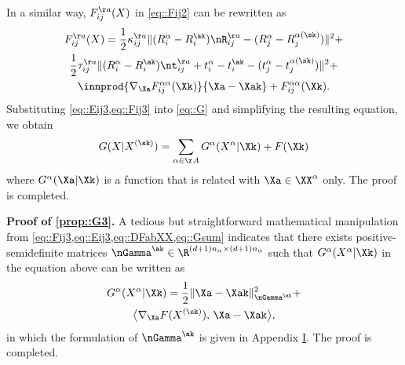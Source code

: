In a similar way, $F_{ij}^{\aa}(X)$ in \cref{eq::Fij2} can be rewritten as
\vspace{-0.3em}
\begin{multline}\label{eq::Fij3}
F_{ij}^{\aa}(X)=\frac{1}{2}\kappa_{ij}^{\aa}\|(R_i^\alpha-R_i^{\ak})\nR_{ij}^{\aa} -(R_j^\alpha-R_j^{\alpha(\sk)})\|^2 +\\ 
\frac{1}{2}\tau_{ij}^{\aa}\|(R_i^\alpha-R_i^{\ak}) \nt_{ij}^{\aa}+t_i^\alpha - t_i^{\ak} - (t_j^\alpha-t_j^{\alpha(\sk)})\|^2+\\
\innprod{\nabla_{\Xa} F_{ij}^{\alpha\alpha}(\Xk)}{\Xa-\Xak} + F_{ij}^{\alpha\alpha}(\Xk).
\end{multline}
Substituting \cref{eq::Eij3,eq::Fij3} into \cref{eq::G} and simplifying the resulting equation, we obtain
\begin{equation}\label{eq::Gsum}
G(X|X^{(\sk)})=\sum_{\alpha\in\AA} G^{\alpha}(X^\alpha|\Xk) + F(\Xk)
\end{equation}
where $G^\alpha(\Xa|\Xk)$ is a function that is related with $\Xa\in \XX^\alpha$ only. The proof is completed.

\vspace{1em}

\noindent\textbf{Proof of \ref{prop::G3}.\;}
A tedious but straightforward mathematical manipulation from \cref{eq::Fij3,eq::Eij3,eq::DFabXX,eq::Gsum} indicates that there exists positive-semidefinite matrices $\nGamma^{\ak}\in \R^{(d+1)n_\alpha\times (d+1)n_\alpha}$ such that $G^\alpha(X^\alpha|\Xk)$ in the equation above can be written as
\begin{multline}
	\nonumber
	G^\alpha(X^\alpha|\Xk)=
	\frac{1}{2}\|\Xa-\Xak\|_{\nGamma^{\ak}}^2+\\
	\big\langle\nabla_{\Xa} F(X^{(\sk)}),\,{\Xa-\Xak}\big\rangle,
\end{multline}
in which the formulation of $\nGamma^{\ak}$ is given in Appendix \hyperref[appendix::I]{I}. The proof is completed.


